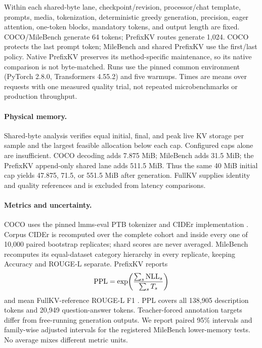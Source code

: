 Within each shared-byte lane, checkpoint/revision, processor/chat template,
prompts, media, tokenization, deterministic greedy generation, precision, eager
attention, one-token blocks, mandatory tokens, and output length are fixed.
COCO/MileBench generate 64 tokens; PrefixKV routes generate 1,024.
COCO protects the last prompt token; MileBench and shared PrefixKV use the
first/last policy. Native PrefixKV preserves its method-specific maintenance,
so its native comparison is not byte-matched. Runs use the pinned common
environment (PyTorch 2.8.0, Transformers 4.55.2) and five warmups.
Times are means over requests with one measured quality trial, not repeated
microbenchmarks or production throughput.

\paragraph{Physical memory.}
Shared-byte analysis verifies equal initial, final, and peak live KV storage
per sample and the largest feasible allocation below each cap. Configured caps
alone are insufficient. COCO decoding adds 7.875 MiB; MileBench adds 31.5 MiB;
the PrefixKV append-only shared lane adds 511.5 MiB. Thus the same 40 MiB
initial cap yields 47.875, 71.5, or 551.5 MiB after generation.
FullKV supplies identity and quality references and is excluded from latency
comparisons.

\paragraph{Metrics and uncertainty.}
COCO uses the pinned lmms-eval PTB tokenizer and CIDEr implementation
\citep{vedantam2015cider}. Corpus CIDEr is recomputed over the complete cohort
and inside every one of 10,000 paired bootstrap replicates; shard scores are
never averaged. MileBench recomputes its equal-dataset category hierarchy in
every replicate, keeping Accuracy and ROUGE-L separate. PrefixKV reports
\begin{equation}
 {\rm PPL}=\exp\!\left(\frac{\sum_s{\rm NLL}_s}{\sum_s T_s}\right)
\end{equation}
and mean FullKV-reference ROUGE-L F1 \citep{lin2004rouge}. PPL covers all
138,905 description tokens and 20,949 question-answer tokens. Teacher-forced
annotation targets differ from free-running generation outputs.
We report paired 95\% intervals \citep{efron1979bootstrap} and family-wise
adjusted intervals for the registered MileBench lower-memory tests.
No average mixes different metric units.

